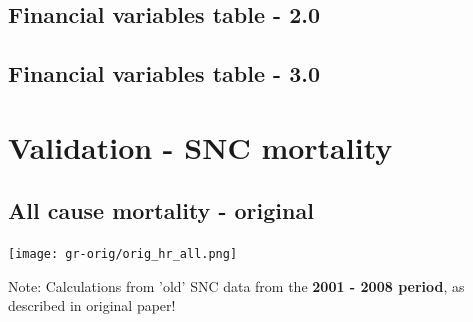 \documentclass[a4paper, notitlepage, fleqn]{article} %
\begin{document}
\subsection{Financial variables table - 2.0}
\begin{stlog}\end{stlog}
\newpage
\begin{stlog}\end{stlog}
\newpage
\begin{stlog}\end{stlog}
\newpage
\subsection{Financial variables table - 3.0}
\begin{stlog}\end{stlog}
\newpage
\begin{stlog}\end{stlog}
\newpage
\begin{stlog}\end{stlog}
\newpage
\section{Validation - SNC mortality}

\subsection{All cause mortality - original}

\begin{center}
\texttt{[image: gr-orig/orig\_hr\_all.png]} 
\end{center}

Note: 	Calculations from 'old' SNC data from the \textbf{2001 - 2008 period}, as described in original paper!

\end{document}
